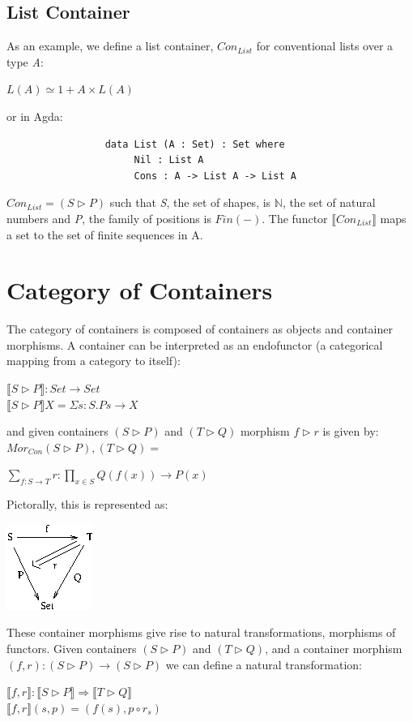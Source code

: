 \documentclass[12pt]{report}
\begin{document}
\subsection{List Container}
As an example, we define a list container, $Con_{List}$ for conventional lists over a type \textit{A}:
\begin{center}
$ L(A) \simeq 1 + A \times L(A) $
\end{center}
or in Agda:
\begin{verbatim}
                 data List (A : Set) : Set where
                      Nil : List A
                      Cons : A -> List A -> List A
\end{verbatim}
 $Con_{List} = (S \rhd P) $ such that \textit{S}, the set of shapes, is $\mathbb{N}$, the set of natural numbers and \textit{P}, the family of positions is $Fin(-)$. The functor $\llbracket Con_{List} \rrbracket$ maps a set to the set of finite sequences in A.


\section{Category of Containers}
The category of containers is composed of containers as objects and container morphisms.
A container can be interpreted as an endofunctor (a categorical mapping from a category to itself):
\begin{center}
$\llbracket S \rhd P\rrbracket : Set \to Set$\\
$ \llbracket S \rhd P\rrbracket X = \Sigma s : S. P s \to X $
\end{center}
and given containers $ (S \rhd P)$ and $ (T \rhd Q)$ morphism $ f \rhd r $ is given by:
\linebreak
\linebreak
$Mor_{Con}(S \rhd P),(T \rhd Q) = $
\begin{center}
$ \sum_{f : S \to T} r : \prod_{x \in S} Q(f(x)) \to P(x)$
\end{center}
Pictorally, this is represented as:
\begin{center}
\includegraphics[scale=1]{cm.png}
\end{center}
These container morphisms give rise to natural transformations, morphisms of functors. Given containers $ (S \rhd P)$ and $ (T \rhd Q)$, and a container morphism $ (f , r) : (S \rhd P) \to (S \rhd P)$ we can define a natural transformation:
\begin{center}
$ \llbracket f,r\rrbracket : \llbracket S \rhd P\rrbracket \Rightarrow \llbracket T \rhd Q\rrbracket$ \\
$  \llbracket f,r\rrbracket (s,p) = (f(s),p \circ r_s) $
\end{center}
\end{document}
